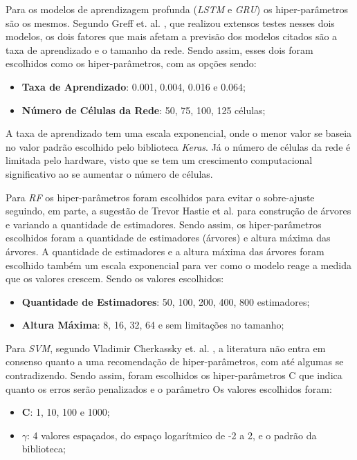 Para os modelos de aprendizagem profunda (\textit{\acrshort{LSTM}} e \textit{\acrshort{GRU}}) os hiper-parâmetros são os mesmos. Segundo Greff et. al. \cite{Greff_2015}, que realizou extensos testes nesses dois modelos, os dois fatores que mais afetam a previsão dos modelos citados são a taxa de aprendizado e o tamanho da rede. Sendo assim, esses dois foram escolhidos como os hiper-parâmetros, com as opções sendo:

\begin{itemize}
    \item \textbf{Taxa de Aprendizado}: 0.001, 0.004, 0.016 e 0.064;
    \item \textbf{Número de Células da Rede}: 50, 75, 100, 125 células;
\end{itemize}

A taxa de aprendizado tem uma escala exponencial, onde o menor valor se baseia no valor padrão escolhido pelo biblioteca \textit{Keras}. Já o número de células da rede é limitada pelo hardware, visto que se tem um crescimento computacional significativo ao se aumentar o número de células. 

Para \textit{\acrshort{RF}} os hiper-parâmetros foram escolhidos para evitar o sobre-ajuste seguindo, em parte, a sugestão de Trevor Hastie et al. \cite{hastie2005elements} para construção de árvores e variando a quantidade de estimadores. Sendo assim, os hiper-parâmetros escolhidos foram a quantidade de estimadores (árvores) e altura máxima das árvores. A quantidade de estimadores e a altura máxima das árvores foram escolhido também um escala exponencial para ver como o modelo reage a medida que os valores crescem.  Sendo os valores escolhidos:

\begin{itemize}
    \item \textbf{Quantidade de Estimadores}: 50, 100, 200, 400, 800 estimadores;
    \item \textbf{Altura Máxima}: 8, 16, 32, 64 e sem limitações no tamanho;
\end{itemize}

Para \textit{\acrshort{SVM}}, segundo Vladimir Cherkassky et. al. \cite{CHERKASSKY2004113}, a literatura não entra em consenso quanto a uma recomendação de hiper-parâmetros, com até algumas se contradizendo. Sendo assim, foram escolhidos os hiper-parâmetros C que indica quanto os erros serão penalizados e o parâmetro Os valores escolhidos foram:

\begin{itemize}
    \item \textbf{C}: 1, 10, 100 e 1000;
    \item \textbf{\(\gamma\)}: 4 valores espaçados, do espaço logarítmico de -2 a 2, e o padrão da biblioteca; 
\end{itemize}

